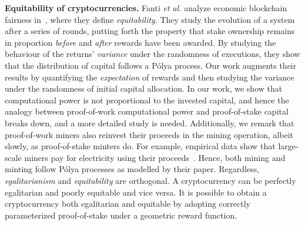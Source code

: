 \noindent\textbf{Equitability of cryptocurrencies.}
Fanti \textit{et al.} analyze economic blockchain fairness
in~\cite{equitability}, where they define \emph{equitability}. They study the
evolution of a system after a series of rounds, putting forth the property that
stake ownership remains in proportion \emph{before} and \emph{after} rewards
have been awarded. By studying the behaviour of the returns' \emph{variance}
under the randomness of executions, they show that the distribution of capital
follows a Pólya process. Our work augments their results by quantifying the \emph{expectation}
of rewards and then studying the variance under the randomness of initial capital
allocation. In our work, we show that
computational power is not proportional to the invested capital, and hence the
analogy between proof-of-work computational power and proof-of-stake capital
breaks down, and a more detailed study is needed. Additionally, we remark that
proof-of-work miners also reinvest their proceeds in the mining operation,
albeit slowly, as proof-of-stake minters do. For example, empirical data show
that large-scale miners pay for electricity using their
proceeds~\cite{kharif2018}. Hence, both mining and minting follow Pólya
processes as modelled by their paper.
Regardless, \emph{egalitarianism} and \emph{equitability} are orthogonal. A
cryptocurrency can be perfectly egalitarian and poorly equitable and vice versa.
It is possible to obtain a cryptocurrency both egalitarian and equitable by
adopting correctly parameterized proof-of-stake under a geometric reward
function.

